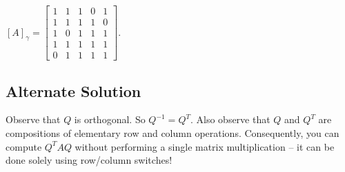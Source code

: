 \documentclass[twoside]{article}
\theoremstyle{definition}
\theoremstyle{definition}
\theoremstyle{remark}
\begin{document}
$[A]_{\gamma} = 
\begin{bmatrix}
    1 & 1 & 1 & 0 & 1 \\
    1 & 1 & 1 & 1 & 0 \\
    1 & 0 & 1 & 1 & 1 \\
    1 & 1 & 1 & 1 & 1 \\
    0 & 1 & 1 & 1 & 1 
\end{bmatrix}$.

\subsection{Alternate Solution}

Observe that $Q$ is orthogonal. So $Q^{-1} = Q^T$. Also observe that $Q$ and $Q^T$ are compositions of elementary row and column operations.
Consequently, you can compute $Q^T A Q$ without performing a single matrix multiplication -- it can be done solely using row/column switches!
\end{document}
